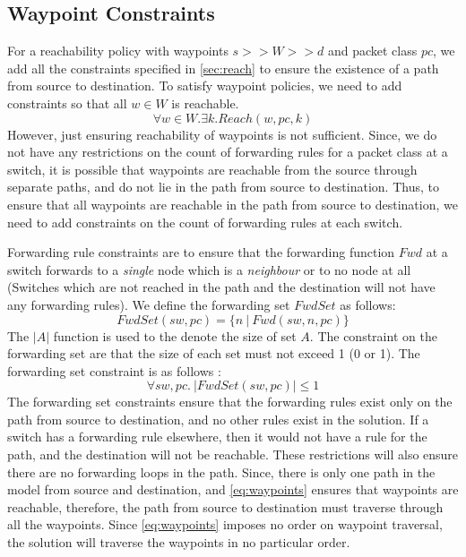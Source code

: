 \documentclass[]{sig}
\begin{document}
\subsection{Waypoint Constraints} 
For a reachability policy with waypoints $s >> W >> d$ and packet class $pc$, we add all the constraints specified in \cref{sec:reach} to ensure the existence of a path from source to destination. To satisfy waypoint policies, we need to add constraints so that all $w \in W$ is reachable. 
\begin{equation} \label{eq:waypoints}
	\forall w \in W. \exists k. Reach(w, pc, k)
\end{equation}
However, just ensuring reachability of waypoints is not sufficient. Since, we do not have any restrictions on the count of forwarding rules for a packet class at a switch, it is possible that waypoints are reachable from the source through separate paths, and do not lie in the path from source to destination. Thus, to ensure that all waypoints are reachable in the path from source to destination, we need to add constraints on the count of forwarding rules at each switch. 

Forwarding rule constraints are to ensure that the forwarding function $Fwd$ at a switch forwards to a \emph{single} node which is a \emph{neighbour} or to no node at all (Switches which are not reached in the path and the destination will not have any forwarding rules). We define the forwarding set $FwdSet$ as follows:
\begin{equation}
	FwdSet(sw,pc) = \{n \ | \ Fwd(sw,n,pc)\}
\end{equation}
The $|A|$ function is used to the denote the size of set $A$. The constraint on the forwarding set are that the size of each set must not exceed 1 (0 or 1). The forwarding set constraint is as follows : 
\begin{equation}
		\forall sw,pc . \ |FwdSet(sw,pc)| \leq 1 \label{eq:fwdset}
\end{equation}
The forwarding set constraints ensure that the forwarding rules exist only on the path from source to destination, and no other rules exist in the solution. If a switch has a forwarding rule elsewhere, then it would not have a rule for the path, and the destination will not be reachable. These restrictions will also ensure there are no forwarding loops in the path. 
Since, there is only one path in the model from source and destination, and \cref{eq:waypoints} ensures that waypoints are reachable, therefore, the path from source to destination must traverse through all the waypoints. Since \cref{eq:waypoints} imposes no order on waypoint traversal, the solution will traverse the waypoints in no particular order. 
\end{document}
